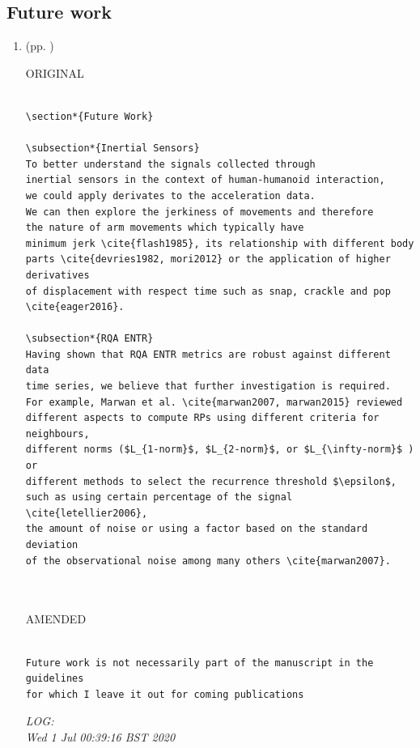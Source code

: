 \documentclass[10pt]{article}
\begin{document}
\subsection{Future work}

\begin{enumerate}


\item  (pp. ) 

ORIGINAL
\begin{verbatim}

\section*{Future Work}

\subsection*{Inertial Sensors}
To better understand the signals collected through 
inertial sensors in the context of human-humanoid interaction, 
we could apply derivates to the acceleration data. 
We can then explore the jerkiness of movements and therefore 
the nature of arm movements which typically have 
minimum jerk \cite{flash1985}, its relationship with different body 
parts \cite{devries1982, mori2012} or the application of higher derivatives 
of displacement with respect time such as snap, crackle and pop \cite{eager2016}.

\subsection*{RQA ENTR}
Having shown that RQA ENTR metrics are robust against different data
time series, we believe that further investigation is required. 
For example, Marwan et al. \cite{marwan2007, marwan2015} reviewed 
different aspects to compute RPs using different criteria for neighbours, 
different norms ($L_{1-norm}$, $L_{2-norm}$, or $L_{\infty-norm}$ ) or 
different methods to select the recurrence threshold $\epsilon$, 
such as using certain percentage of the signal \cite{letellier2006}, 
the amount of noise or using a factor based on the standard deviation 
of the observational noise among many others \cite{marwan2007}.



\end{verbatim}
AMENDED
\begin{verbatim}

Future work is not necessarily part of the manuscript in the guidelines 
for which I leave it out for coming publications
\end{verbatim}

	\textit{
	LOG:\\ 
	Wed  1 Jul 00:39:16 BST 2020
	}
	\\




\end{enumerate}
\end{document}
